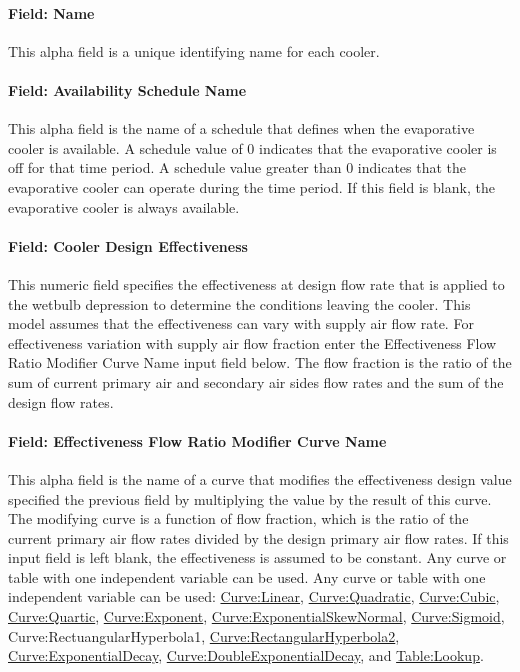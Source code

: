 \paragraph{Field: Name}\label{field-name-1-013}

This alpha field is a unique identifying name for each cooler.

\paragraph{Field: Availability Schedule Name}\label{field-availability-schedule-name-006}

This alpha field is the name of a schedule that defines when the evaporative cooler is available. A schedule value of 0 indicates that the evaporative cooler is off for that time period. A schedule value greater than 0 indicates that the evaporative cooler can operate during the time period. If this field is blank, the evaporative cooler is always available.

\paragraph{Field: Cooler Design Effectiveness}\label{field-cooler-design-effectiveness}

This numeric field specifies the effectiveness at design flow rate that is applied to the wetbulb depression to determine the conditions leaving the cooler. This model assumes that the effectiveness can vary with supply air flow rate. For effectiveness variation with supply air flow fraction enter the Effectiveness Flow Ratio Modifier Curve Name input field below. The flow fraction is the ratio of the sum of current primary air and secondary air sides flow rates and the sum of the design flow rates.

\paragraph{Field: Effectiveness Flow Ratio Modifier Curve Name}\label{field-effectiveness-flow-ratio-modifier-curve-name}

This alpha field is the name of a curve that modifies the effectiveness design value specified the previous field by multiplying the value by the result of this curve. The modifying curve is a function of flow fraction, which is the ratio of the current primary air flow rates divided by the design primary air flow rates. If this input field is left blank, the effectiveness is assumed to be constant. Any curve or table with one independent variable can be used. Any curve or table with one independent variable can be used: \hyperref[curvelinear]{Curve:Linear}, \hyperref[curvequadratic]{Curve:Quadratic}, \hyperref[curvecubic]{Curve:Cubic}, \hyperref[curvequartic]{Curve:Quartic}, \hyperref[curveexponent]{Curve:Exponent}, \hyperref[curveexponentialskewnormal]{Curve:ExponentialSkewNormal}, \hyperref[curvesigmoid]{Curve:Sigmoid}, Curve:RectuangularHyperbola1, \hyperref[curverectangularhyperbola2]{Curve:RectangularHyperbola2}, \hyperref[curveexponentialdecay]{Curve:ExponentialDecay}, \hyperref[curvedoubleexponentialdecay]{Curve:DoubleExponentialDecay}, and \hyperref[tablelookup]{Table:Lookup}.

